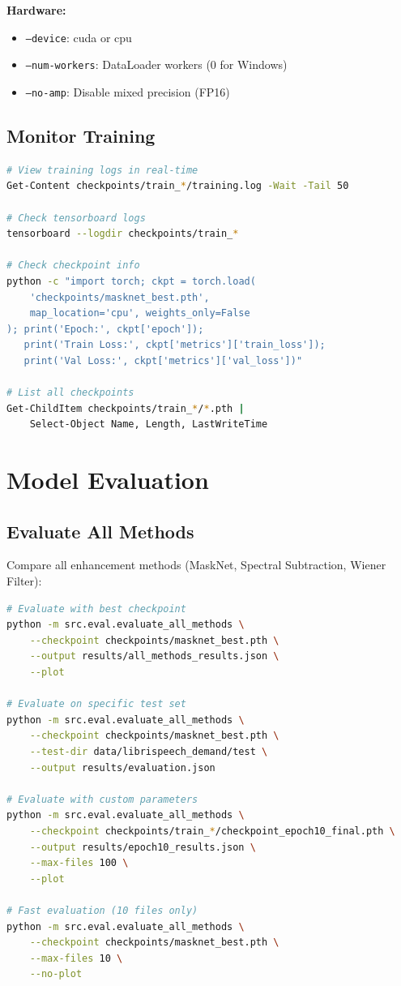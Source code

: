 \documentclass[12pt,a4paper]{article}
\begin{document}
\textbf{Hardware:}
\begin{itemize}
    \item \texttt{--device}: cuda or cpu
    \item \texttt{--num-workers}: DataLoader workers (0 for Windows)
    \item \texttt{--no-amp}: Disable mixed precision (FP16)
\end{itemize}

\subsection{Monitor Training}

\begin{lstlisting}[language=bash]
# View training logs in real-time
Get-Content checkpoints/train_*/training.log -Wait -Tail 50

# Check tensorboard logs
tensorboard --logdir checkpoints/train_*

# Check checkpoint info
python -c "import torch; ckpt = torch.load(
    'checkpoints/masknet_best.pth', 
    map_location='cpu', weights_only=False
); print('Epoch:', ckpt['epoch']); 
   print('Train Loss:', ckpt['metrics']['train_loss']); 
   print('Val Loss:', ckpt['metrics']['val_loss'])"

# List all checkpoints
Get-ChildItem checkpoints/train_*/*.pth | 
    Select-Object Name, Length, LastWriteTime
\end{lstlisting}

\section{Model Evaluation}

\subsection{Evaluate All Methods}

Compare all enhancement methods (MaskNet, Spectral Subtraction, Wiener Filter):

\begin{lstlisting}[language=bash]
# Evaluate with best checkpoint
python -m src.eval.evaluate_all_methods \
    --checkpoint checkpoints/masknet_best.pth \
    --output results/all_methods_results.json \
    --plot

# Evaluate on specific test set
python -m src.eval.evaluate_all_methods \
    --checkpoint checkpoints/masknet_best.pth \
    --test-dir data/librispeech_demand/test \
    --output results/evaluation.json

# Evaluate with custom parameters
python -m src.eval.evaluate_all_methods \
    --checkpoint checkpoints/train_*/checkpoint_epoch10_final.pth \
    --output results/epoch10_results.json \
    --max-files 100 \
    --plot

# Fast evaluation (10 files only)
python -m src.eval.evaluate_all_methods \
    --checkpoint checkpoints/masknet_best.pth \
    --max-files 10 \
    --no-plot
\end{lstlisting}
\end{document}
